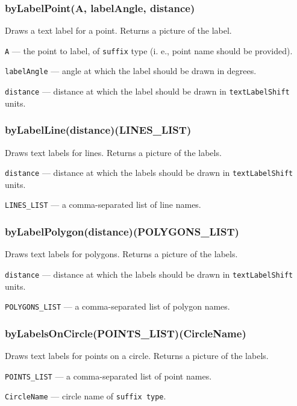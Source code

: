 \documentclass{ltxdoc}
\begin{document}
\subsubsection{byLabelPoint(A, labelAngle, distance)}\label{byLabelPoint}
Draws a text label for a point. Returns a picture of the label.
	
	\texttt{A} — the point to label, of \texttt{suffix} type (i. e., point name should be provided).
	
	\texttt{labelAngle} — angle at which the label should be drawn in degrees.
	
	\texttt{distance} — distance at which the label should be drawn in \texttt{textLabelShift} units.

\subsubsection{byLabelLine(distance)(LINES\_LIST)}\label{byLabelLine}
	
	Draws text labels for lines. Returns a picture of the labels.
	
	\texttt{distance} — distance at which the labels should be drawn in \texttt{textLabelShift} units.
	
	\texttt{LINES\_LIST} — a comma-separated list of line names.

\subsubsection{byLabelPolygon(distance)(POLYGONS\_LIST)}\label{byLabelPolygon}
	
	Draws text labels for polygons. Returns a picture of the labels.
	
	\texttt{distance} — distance at which the labels should be drawn in \texttt{textLabelShift} units.
	
	\texttt{POLYGONS\_LIST} — a comma-separated list of polygon names.


\subsubsection{byLabelsOnCircle(POINTS\_LIST)(CircleName)}\label{byLabelsOnCircle}
	
	Draws text labels for points on a circle. Returns a picture of the labels.
	
	\texttt{POINTS\_LIST} — a comma-separated list of point names.
	
	\texttt{CircleName} — circle name of \texttt{suffix type}.
\end{document}
